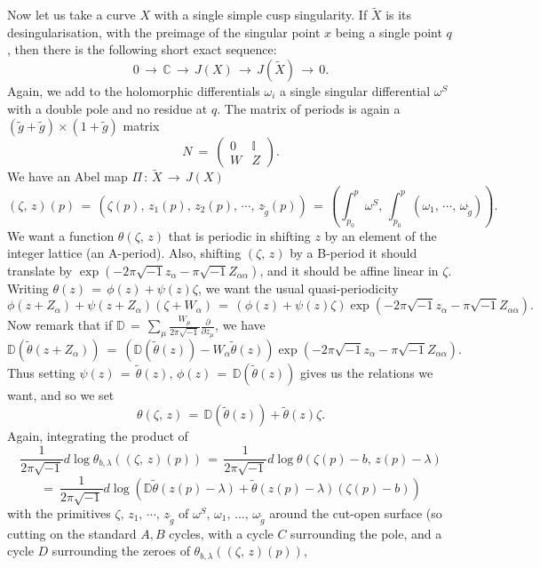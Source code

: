 \documentclass[12pt,reqno]{amsart}
\numberwithin{equation}{section}
\theoremstyle{definition}
\theoremstyle{remark}
\def\bC{{\mathbb {C}}}
\def\bD{{\mathbb {D}}}
\def\bI{{\mathbb {I}}}
\def\bD{{\mathbb {D}}}
\begin{document}
Now let us take a curve $X$ with a single simple cusp singularity.
If $\widetilde X$ is its desingularisation, with the preimage of the singular point $x$ being a
single point $q$, then there is the following short exact sequence:
$$0\,\longrightarrow\, \bC\,\longrightarrow\, J(X)\,\longrightarrow\, J(\widetilde X)
\,\longrightarrow\, 0.$$
Again, we  add to the holomorphic differentials $\omega_i$ a single singular differential $\omega^S$
with a double pole and no residue at $q$. The matrix of periods is again a
$(\widetilde g +\widetilde g)\times(1+ \widetilde g )$ matrix 
$$ N\ =\ \begin{pmatrix}   0 &\bI \\  W& Z\end{pmatrix}.$$
We have an Abel map $\Pi\, :\, \widetilde{X}\,\longrightarrow\, J(X)$
$$ (\zeta,\, z)(p) \,=\, (\zeta(p),\, z_1(p),\, z_2(p),\,\cdots ,\,z_{\widetilde g}(p))
\,=\, (\int_{p_0}^{p}  \omega^S,\, \int_{p_0}^{p}( \omega_1,\,\cdots ,\,\omega_{\widetilde g})).$$
We want a function $\theta(\zeta,\, z)$ that is periodic in shifting $z$ by an element of the integer
lattice (an A-period). Also, shifting $(\zeta,\, z)$ by a B-period it should translate by
$\exp(-2\pi\sqrt{-1} z_\alpha -\pi \sqrt{-1} Z_{\alpha\alpha})$, and it should be affine linear in $\zeta$.
Writing $\theta(z) \,=\, \phi(z) + \psi(z)\zeta$, we want the usual quasi-periodicity
$$ \phi(z +Z_\alpha) + \psi(z+Z_\alpha)(\zeta + W_\alpha)
\,=\, (\phi(z) + \psi(z)\zeta)\exp (-2\pi \sqrt{-1} z_\alpha -\pi\sqrt{-1} Z_{\alpha\alpha}).$$
Now remark that if $\bD\,=\, \sum_\mu \frac{W_\mu}{2\pi\sqrt{-1}}\frac{\partial}{\partial z_\mu}$, we have 
$$
\bD(\widetilde{\theta}(z+Z_\alpha) )\ =\ (\bD(\widetilde{\theta}(z)) - W_\alpha \widetilde\theta(z))
\exp(-2\pi \sqrt{-1}z_\alpha - \pi\sqrt{-1} Z_{\alpha\alpha}).$$
Thus setting $\psi(z) \,=\, \widetilde{\theta}(z),\, \phi(z)\,=\,\bD(\widetilde{\theta}(z))$ gives us
the relations we want, and so we set
$$
\theta(\zeta,\, z)\, = \,\bD(\widetilde{\theta}(z)) + \widetilde{\theta}(z)\zeta .
$$
Again, integrating the product of 
$$
\frac{1}{2\pi\sqrt{-1}} d\log \theta_{b,\lambda}((\zeta,\, z)(p))\, =\,
\frac{1}{2\pi\sqrt{-1}} d\log \theta(\zeta(p) -b,\, z(p)-\lambda)
$$
$$
= \ \frac{1}{2\pi\sqrt{-1}} d\log (\bD \widetilde{\theta}(z(p)-\lambda) + 
\widetilde{\theta}(z(p)-\lambda)(\zeta(p)-b))
$$
with the primitives $\zeta,\, z_1,\,\cdots ,\, z_{\widetilde g}$ of $\omega^S,\, \omega_1,\, ...,\,  \omega_{\widetilde g}$  around the cut-open surface (so cutting on the standard $A,B$ cycles, with a cycle $C$ surrounding the pole, and a cycle $D$ surrounding the zeroes of $\theta_{b,\lambda}((\zeta,\, z)(p))$,
\end{document}
